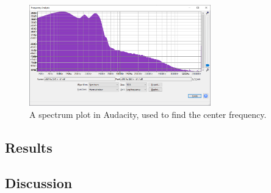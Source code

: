 \begin{figure}[!ht]
    \centering
    \includegraphics[width=0.7\textwidth]{images/6-pentesting/audacity-spectrum.png}
    \caption{A spectrum plot in Audacity, used to find the center frequency.}
    \label{fig:audacity-spectrum}
\end{figure}

\subsection{Results}
\todo

\subsection{Discussion}
\todo
